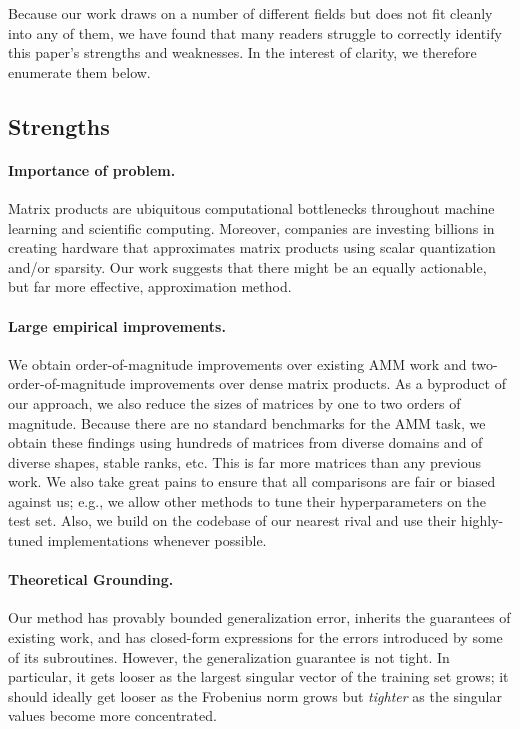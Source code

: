 

Because our work draws on a number of different fields but does not fit cleanly into any of them, we have found that many readers struggle to correctly identify this paper's strengths and weaknesses. In the interest of clarity, we therefore enumerate them below.

\subsection{Strengths}
%
\paragraph{Importance of problem.}
Matrix products are ubiquitous computational bottlenecks throughout machine learning and scientific computing.
Moreover, companies are investing billions in creating hardware that approximates matrix products \cite{nvidia10k2021} using scalar quantization and/or sparsity. Our work suggests that there might be an equally actionable, but far more effective, approximation method.
%
\vspace{-2mm}
\paragraph{Large empirical improvements.} We obtain order-of-magnitude improvements over existing AMM work and two-order-of-magnitude improvements over dense matrix products. As a byproduct of our approach, we also reduce the sizes of matrices by one to two orders of magnitude.
Because there are no standard benchmarks for the AMM task, we obtain these findings using hundreds of matrices from diverse domains and of diverse shapes, stable ranks, etc. This is far more matrices than any previous work. We also take great pains to ensure that all comparisons are fair or biased against us; e.g., we allow other methods to tune their hyperparameters on the test set. Also, we build on the codebase of our nearest rival \cite{bolt} and use their highly-tuned implementations whenever possible.
%
\vspace{-3mm}
\paragraph{Theoretical Grounding.}
Our method has provably bounded generalization error, inherits the guarantees of existing work, and has closed-form expressions for the errors introduced by some of its subroutines. However, the generalization guarantee is not tight. In particular, it gets looser as the largest singular vector of the training set grows; it should ideally get looser as the Frobenius norm grows but \textit{tighter} as the singular values become more concentrated.

